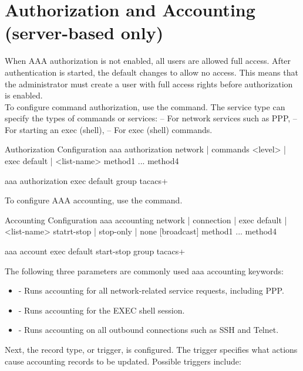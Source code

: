 \section{Authorization and Accounting (server-based only)}

When AAA authorization is not enabled, all users are allowed full access. After authentication is started, the default changes to allow no access. This means that the administrator must create a user with full access rights before authorization is enabled. \\

To configure command authorization, use the  command. The service type can specify the types of commands or services:
 -- For network services such as PPP,  -- For starting an exec (shell),  -- For exec (shell) commands. 

\begin{sexylisting}{Authorization Configuration}
aaa authorization {network | commands <level> | exec} {default | <list-name>} 
  method1 ... method4
  
aaa authorization exec default group tacacs+
\end{sexylisting}

To configure AAA accounting, use the  command. 

\begin{sexylisting}{Accounting Configuration}
aaa accounting {network | connection | exec} {default | <list-name>} 
         {statrt-stop | stop-only | none} [broadcast] method1 ... method4

aaa account exec default start-stop group tacacs+
\end{sexylisting}

The following three parameters are commonly used aaa accounting keywords:

\begin{itemize}
\item {} - Runs accounting for all network-related service requests, including PPP.
\item {} - Runs accounting for the EXEC shell session.
\item {} - Runs accounting on all outbound connections such as SSH and Telnet.
\end{itemize}

Next, the record type, or trigger, is configured. The trigger specifies what actions cause accounting records to be updated. Possible triggers include:

